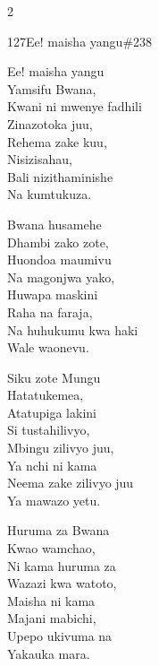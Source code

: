 \begin{multicols}{2}
\begin{hymn}{127}{Ee! maisha yangu}{\#238}
\begin{stanza}
Ee! maisha yangu\\
Yamsifu Bwana,\\
Kwani ni mwenye fadhili\\
Zinazotoka juu,\\
Rehema zake kuu,\\
Nisizisahau,\\
Bali nizithaminishe\\
Na kumtukuza.
\end{stanza}
\begin{stanza}
Bwana husamehe\\
Dhambi zako zote,\\
Huondoa maumivu\\
Na magonjwa yako,\\
Huwapa maskini\\
Raha na faraja,\\
Na huhukumu kwa haki\\
Wale waonevu.
\end{stanza}
\begin{stanza}
Siku zote Mungu\\
Hatatukemea,\\
Atatupiga lakini\\
Si tustahilivyo,\\
Mbingu zilivyo juu,\\
Ya nchi ni kama\\
Neema zake zilivyo juu\\
Ya mawazo yetu.
\end{stanza}
\begin{stanza}
Huruma za Bwana\\
Kwao wamchao,\\
Ni kama huruma za\\
Wazazi kwa watoto,\\
Maisha ni kama\\
Majani mabichi,\\
Upepo ukivuma na\\
Yakauka mara.
\end{stanza}
\end{hymn}


\end{multicols}
